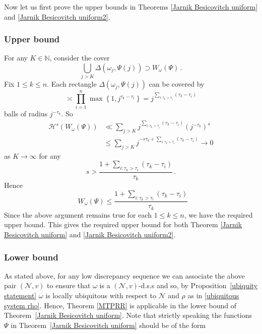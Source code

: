\documentclass{amsart}
\theoremstyle{definition}
\newcommand{\N}{\mathbb N}%
\newcommand{\0}{\mbf 0}%
\newcommand{\cH}{\mathcal{H}}
\newcommand{\cN}{{\mathcal N}}
\DeclareMathOperator{\dimh}{\dim_H}
\def\N{\mathbb N}
\begin{document}
Now let us first prove the upper bounds in Theorems \ref{Jarnik Besicovitch uniform} and \ref{Jarnik Besicovitch uniform2}.
\subsubsection{Upper bound}
For any $K\in\N$, consider the cover
\begin{equation*}
    \bigcup_{j>K}\Delta(\omega_{j},\Psi(j)) \supset W_{\omega}(\Psi)\, .
\end{equation*}
Fix $1\leq k \leq n$. Each rectangle $\Delta(\omega_{j},\Psi(j))$ can be covered by
\begin{equation*}
    \asymp\prod_{i=1}^{n}\max\left\{1, j^{\tau_{k}-\tau_{i}}\right\}=j^{\sum_{i:\tau_{k}>\tau_{i}}(\tau_{k}-\tau_{i})}
\end{equation*}
balls of radius $j^{-\tau_{k}}$. So
\begin{align*}
    \cH^{s}\left(W_{\omega}(\Psi)\right) & \ll \sum_{j>K} j^{\sum_{i:\tau_{k}>\tau_{i}}(\tau_{k}-\tau_{i})} (j^{-\tau_{k}})^{s} \\
    & \leq \sum_{j> K} j^{-s\tau_{k}+\sum_{i:\tau_{k}>\tau_{i}}(\tau_{k}-\tau_{i})} \to 0
\end{align*}
as $K\to \infty$ for any
\begin{equation*}
    s> \frac{1+\sum_{i:\tau_{k}>\tau_{i}}(\tau_{k}-\tau_{i})}{\tau_{k}}\, .
\end{equation*}
Hence
\begin{equation*}
    \dimh W_{\omega}(\Psi) \leq \frac{1+\sum_{i:\tau_{k}>\tau_{i}}(\tau_{k}-\tau_{i})}{\tau_{k}}
\end{equation*}
Since the above argument remains true for each $1\leq k \leq n$, we have the required upper bound. This gives the required upper bound for both Theorem \ref{Jarnik Besicovitch uniform} and \ref{Jarnik Besicovitch uniform2}.

\subsubsection{Lower bound}
        As stated above, for any low discrepancy sequence we can associate the above pair $(\cN,v)$ to ensure that $\omega$ is a $(\cN,v)$-d.s.s and so, by Proposition~\ref{ubiquity statement} $\omega$ is locally ubiquitous with respect to  $\cN$ and $\rho$ as in \eqref{ubiquitous system rho}.
Hence, Theorem \ref{MTPRR} is applicable in the lower bound of Theorem~\ref{Jarnik Besicovitch uniform}. Note that strictly speaking the functions $\Psi$ in Theorem~\ref{Jarnik Besicovitch uniform} should be of the form
\end{document}
